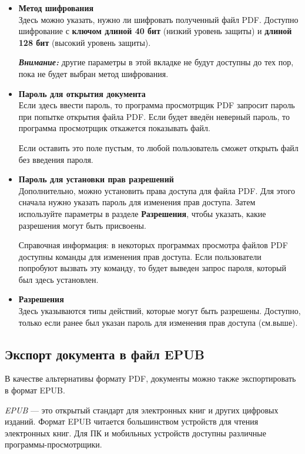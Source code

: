 ﻿\documentclass[a4paper,10pt]{article}
\begin{document}
\begin{itemize}
 \item \textbf{Метод шифрования}\\
 Здесь можно указать, нужно ли шифровать полученный файл PDF. Доступно шифрование с \textbf{ключом длиной 40 бит} (низкий уровень защиты) и \textbf{длиной 128 бит} (высокий уровень защиты).
 
 \begin{mdframed}[backgroundcolor=blue!10]
\textbf{\textit{Внимание:}} другие параметры в этой вкладке не будут доступны до тех пор, пока не будет выбран метод шифрования.
\end{mdframed}
\item \textbf{Пароль для открытия документа}\\
Если здесь ввести пароль, то программа просмотрщик PDF запросит пароль при попытке открытия файла PDF. Если будет введён неверный пароль, то программа просмотрщик откажется показывать файл.

Если оставить это поле пустым, то любой пользователь сможет открыть файл без введения пароля.
\item \textbf{Пароль для установки прав разрешений}\\
Дополнительно, можно установить права доступа для файла PDF. Для этого сначала нужно указать пароль для изменения прав доступа. Затем используйте параметры в разделе \textbf{Разрешения}, чтобы указать, какие разрешения могут быть присвоены.

Справочная информация: в некоторых программах просмотра файлов PDF доступны команды для изменения прав доступа. Если пользователи попробуют вызвать эту команду, то будет выведен запрос пароля, который был здесь установлен.
\item \textbf{Разрешения}\\
Здесь указываются типы действий, которые могут быть разрешены. Доступно, только если ранее был указан пароль для изменения прав доступа (см.выше).
\end{itemize}

\subsection{Экспорт документа в файл EPUB}
В качестве альтернативы формату PDF, документы можно также экспортировать в формат EPUB.

\textit{EPUB} — это открытый стандарт для электронных книг и других цифровых изданий. Формат EPUB читается большинством устройств для чтения электронных книг. Для ПК и мобильных устройств доступны различные программы-просмотрщики.
\end{document}
